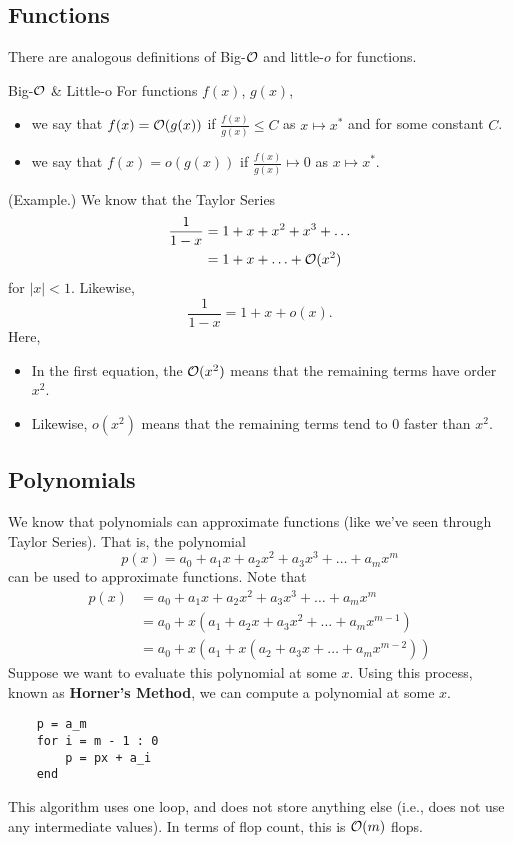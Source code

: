 \documentclass[letterpaper]{article}
\begin{document}
\subsection{Functions}
There are analogous definitions of Big-$\mathcal{O}$ and little-$o$ for functions. 

\begin{definition}{Big-$\mathcal{O}$ \& Little-o}{}
    For functions $f(x)$, $g(x)$, 
    \begin{itemize}
        \item we say that $f(x) = \mathcal{O}(g(x))$ if $\frac{f(x)}{g(x)} \leq C$ as $x \mapsto x^*$ and for some constant $C$. 
        \item we say that $f(x) = o(g(x))$ if $\frac{f(x)}{g(x)} \mapsto 0$ as $x \mapsto x^*$. 
    \end{itemize}
\end{definition}

\begin{mdframed}
    (Example.) We know that the Taylor Series \[\begin{aligned}
        \frac{1}{1 - x} &= 1 + x + x^2 + x^3 + \hdots \\
            &= 1 + x + \hdots + \mathcal{O}(x^2)
    \end{aligned}\] for $|x| < 1$. Likewise, \[\frac{1}{1 - x} = 1 + x + o(x).\] Here, 
    \begin{itemize}
        \item In the first equation, the $\mathcal{O}(x^2)$ means that the remaining terms have order $x^2$. 
        \item Likewise, $o(x^2)$ means that the remaining terms tend to 0 faster than $x^2$. 
    \end{itemize}
\end{mdframed}

\subsection{Polynomials}
We know that polynomials can approximate functions (like we've seen through Taylor Series). That is, the polynomial \[p(x) = a_0 + a_1 x + a_2 x^2 + a_3 x^3 + \hdots + a_m x^m\] can be used to approximate functions. Note that
\begin{equation*}
    \begin{aligned}
        p(x) &= a_0 + a_1 x + a_2 x^2 + a_3 x^3 + \hdots + a_m x^m \\ 
            &= a_0 + x(a_1 + a_2 x + a_3 x^2 + \hdots + a_m x^{m - 1}) \\ 
            &= a_0 + x(a_1 + x(a_2 + a_3 x + \hdots + a_m x^{m - 2}))
    \end{aligned}
\end{equation*}
Suppose we want to evaluate this polynomial at some $x$. Using this process, known as \textbf{Horner's Method}, we can compute a polynomial at some $x$. 
\begin{verbatim}
    p = a_m 
    for i = m - 1 : 0 
        p = px + a_i
    end\end{verbatim}
This algorithm uses one loop, and does not store anything else (i.e., does not use any intermediate values). In terms of flop count, this is $\mathcal{O}(m)$ flops. 
\end{document}
